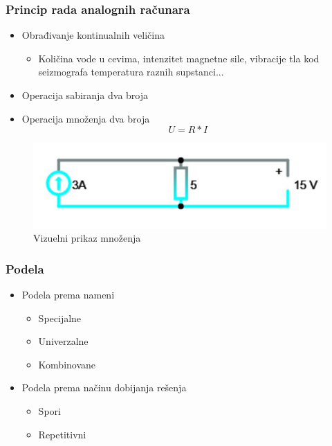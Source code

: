 \documentclass[14pt]{beamer}
\begin{document}
\begin{frame}[fragile]\frametitle{Princip rada analognih računara}
	\begin{itemize}	
		\item Obrađivanje kontinualnih veličina
		  \begin{itemize}
                \item Količina vode u cevima, intenzitet magnetne sile, vibracije tla kod seizmografa temperatura raznih supstanci...
            \end{itemize}          
	

\item Operacija sabiranja dva broja

\item Operacija množenja dva broja \\ $$ U = R*I $$
\end{itemize}
\begin{figure}[h!]
\begin{center}
\includegraphics[scale=0.6]{Struja.jpg}
\end{center}
\caption{Vizuelni prikaz množenja}
\label{fig:h1}
\end{figure}
\end{frame}

\begin{frame}[fragile]\frametitle{Podela}
	\begin{itemize}
		\item Podela prema nameni
		\begin{itemize}
			\item Specijalne
            \item Univerzalne
            \item Kombinovane
		\end{itemize}
	\end{itemize}
\begin{itemize}
	\item Podela prema načinu dobijanja rešenja
	\begin{itemize}
		\item Spori
        \item Repetitivni
	\end{itemize}
\end{itemize}
\end{frame}
\end{document}
